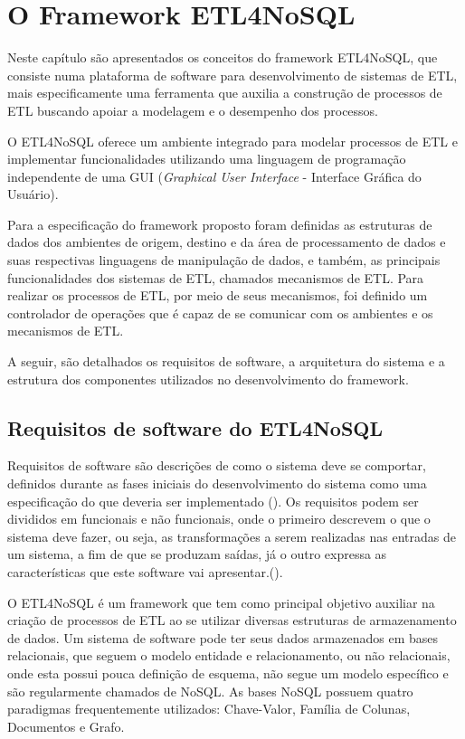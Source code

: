 \chapter{O Framework ETL4NoSQL}
Neste capítulo são apresentados os conceitos do framework ETL4NoSQL, que consiste numa plataforma de software para desenvolvimento de sistemas de ETL, mais especificamente uma ferramenta que auxilia a construção de processos de ETL buscando apoiar a modelagem e o desempenho dos processos. 

O ETL4NoSQL oferece um ambiente integrado para modelar processos de ETL e implementar funcionalidades utilizando uma linguagem de programação independente de uma GUI (\emph{Graphical User Interface} - Interface Gráfica do Usuário).


Para a especificação do framework proposto foram definidas as estruturas de dados dos ambientes de origem, destino e da área de processamento de dados e suas respectivas linguagens de manipulação de dados, e também, as principais funcionalidades dos sistemas de ETL, chamados mecanismos de ETL. Para realizar os processos de ETL, por meio de seus mecanismos, foi definido um controlador de operações que é capaz de se comunicar com os ambientes e os mecanismos de ETL. 

A seguir, são detalhados os requisitos de software, a arquitetura do sistema e a estrutura dos componentes utilizados no desenvolvimento do framework.

\clearpage
\section{Requisitos de software do ETL4NoSQL}


Requisitos de software são descrições de como o sistema deve se comportar, definidos durante as fases iniciais do desenvolvimento do sistema como uma especificação do que deveria ser implementado (\cite{sommerville:2013}). Os requisitos podem ser divididos em funcionais e não funcionais, onde o primeiro descrevem o que o sistema deve fazer, ou seja, as transformações a
serem realizadas nas entradas de um sistema, a fim de que se produzam saídas, já o outro expressa as características que este software vai apresentar.(\cite{sommerville:2013}). 

O ETL4NoSQL é um framework que tem como principal objetivo auxiliar na criação de processos de ETL ao se utilizar diversas estruturas de armazenamento de dados. Um sistema de software pode ter seus dados armazenados em bases relacionais, que seguem o modelo entidade e relacionamento, ou não relacionais, onde esta possui pouca definição de esquema, não segue um modelo específico e são regularmente chamados de NoSQL. As bases NoSQL possuem quatro paradigmas frequentemente utilizados: Chave-Valor, Família de Colunas, Documentos e Grafo.

